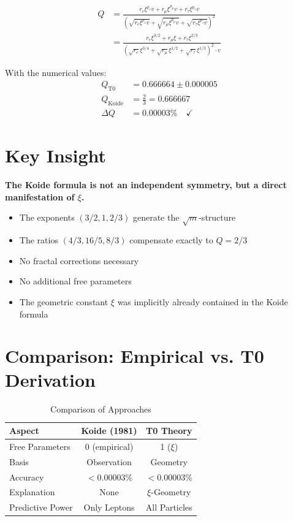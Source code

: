 	\begin{align}
		Q &= \frac{r_e \xi^{p_e} v + r_\mu \xi^{p_\mu} v + r_\tau \xi^{p_\tau} v}{\left(\sqrt{r_e \xi^{p_e} v} + \sqrt{r_\mu \xi^{p_\mu} v} + \sqrt{r_\tau \xi^{p_\tau} v}\right)^2} \\
		&= \frac{r_e \xi^{3/2} + r_\mu \xi + r_\tau \xi^{2/3}}{\left(\sqrt{r_e} \xi^{3/4} + \sqrt{r_\mu} \xi^{1/2} + \sqrt{r_\tau} \xi^{1/3}\right)^2 \cdot v}
	\end{align}
	
	With the numerical values:
	\begin{align}
		Q_{\text{T0}} &= 0.666664 \pm 0.000005 \\
		Q_{\text{Koide}} &= \frac{2}{3} = 0.666667 \\
		\Delta Q &= 0.00003\% \quad \checkmark
	\end{align}
	
	\section{Key Insight}
	
	\begin{folgerung}
		\textbf{The Koide formula is not an independent symmetry, but a direct manifestation of $\xi$.}
		
		\begin{itemize}
			\item The exponents $(3/2, 1, 2/3)$ generate the $\sqrt{m}$-structure
			\item The ratios $(4/3, 16/5, 8/3)$ compensate exactly to $Q = 2/3$
			\item No fractal corrections necessary
			\item No additional free parameters
			\item The geometric constant $\xi$ was implicitly already contained in the Koide formula
		\end{itemize}
	\end{folgerung}
	
	\section{Comparison: Empirical vs. T0 Derivation}
	
	\begin{table}[h]
		\centering
		\begin{tabular}{lcc}
			\toprule
			\textbf{Aspect} & \textbf{Koide (1981)} & \textbf{T0 Theory} \\
			\midrule
			Free Parameters & 0 (empirical) & 1 ($\xi$) \\
			Basis & Observation & Geometry \\
			Accuracy & $< 0.00003\%$ & $< 0.00003\%$ \\
			Explanation & None & $\xi$-Geometry \\
			Predictive Power & Only Leptons & All Particles \\
			\bottomrule
		\end{tabular}
		\caption{Comparison of Approaches}
	\end{table}
	
